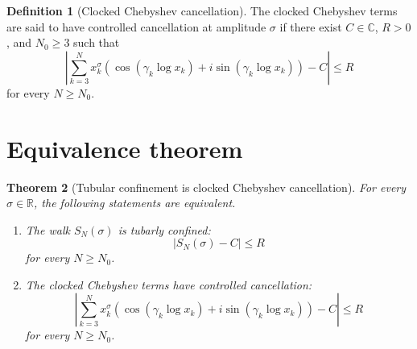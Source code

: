 \documentclass[11pt]{amsart}
\numberwithin{equation}{section}
\theoremstyle{plain}
\newtheorem{theorem}{Theorem}[section]
\theoremstyle{definition}
\newtheorem{definition}[theorem]{Definition}
\theoremstyle{remark}
\begin{document}
\begin{definition}[Clocked Chebyshev cancellation]
\label{def:clocked_chebyshev_cancellation}
The clocked Chebyshev terms are said to have controlled cancellation at
amplitude $\sigma$ if there exist $C\in\mathbb C$, $R>0$, and $N_0\ge 3$
such that
\begin{equation}
\left|
\sum_{k=3}^{N}
x_k^\sigma
\left(
\cos(\gamma_k\log x_k)
+
i\sin(\gamma_k\log x_k)
\right)
-C
\right|
\le R
\label{eq:clocked_chebyshev_cancellation_definition}
\end{equation}
for every $N\ge N_0$.
\end{definition}

\section{Equivalence theorem}
\label{sec:equivalence_theorem}

\begin{theorem}[Tubular confinement is clocked Chebyshev cancellation]
\label{thm:tube_chebyshev_equivalence}
For every $\sigma\in\mathbb R$, the following statements are equivalent.

\begin{enumerate}[label=\textnormal{(\roman*)}]
\item The walk $S_N(\sigma)$ is tubarly confined:
\begin{equation}
|S_N(\sigma)-C|\le R
\label{eq:theorem_tube_condition}
\end{equation}
for every $N\ge N_0$.

\item The clocked Chebyshev terms have controlled cancellation:
\begin{equation}
\left|
\sum_{k=3}^{N}
x_k^\sigma
\left(
\cos(\gamma_k\log x_k)
+
i\sin(\gamma_k\log x_k)
\right)
-C
\right|
\le R
\label{eq:theorem_chebyshev_condition}
\end{equation}
for every $N\ge N_0$.
\end{enumerate}
\end{theorem}
\end{document}
